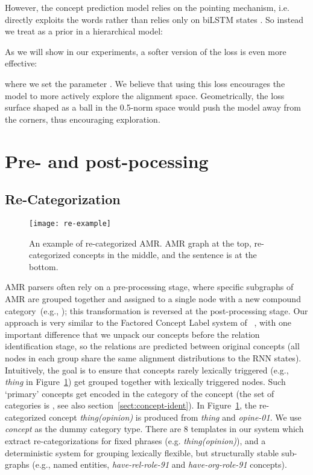 \documentclass[11pt,a4paper]{article}
\begin{document}
However, the concept prediction model  relies on the pointing mechanism, i.e. directly exploits the words  rather than relies only on biLSTM states . So instead we treat  as a prior in a hierarchical model:

As we will show in our experiments, a softer version of the loss 
is even more effective:

where we set the parameter . We believe that using this loss encourages the model to more actively explore the alignment space. Geometrically, the loss surface shaped as a ball in the 0.5-norm space would push the model away from the corners, thus encouraging exploration.

\section{Pre- and post-pocessing}
\label{sect:prepost}

\subsection{Re-Categorization}\label{sec:re-cat}

\begin{figure}[t!]
\centering
\texttt{[image: re-example]}
\vspace{-2ex}
\caption{An example of re-categorized AMR. AMR graph at the top, re-categorized concepts in the middle, and the sentence is at the bottom.}
\label{fig:re-example}
\end{figure}

AMR parsers often rely on a pre-processing stage, where specific subgraphs of AMR are grouped together and assigned to a single node with a new compound category~(e.g., ); this transformation is reversed at the post-processing stage. Our approach is very similar to the Factored Concept Label system of ~, with one important difference that we unpack our concepts before the relation identification stage, so the relations are predicted between original concepts (all nodes in each group share the same alignment distributions to the RNN states). Intuitively, the goal is to ensure that concepts rarely lexically triggered (e.g., \textit{thing} in Figure~\ref{fig:re-example}) get grouped together with lexically triggered nodes. Such `primary' concepts get encoded in the category of the concept (the set of categories is , see also section~\ref{sect:concept-ident}). In Figure~\ref{fig:re-example}, the re-categorized concept {\it thing(opinion)} is produced from {\it thing} and {\it opine-01}. We use \textit{concept} as the dummy category type.
There are 8 templates in our system which extract re-categorizations for fixed phrases (e.g. {\it thing(opinion)}), and a deterministic system for grouping lexically flexible, but structurally stable sub-graphs (e.g., named entities, {\it have-rel-role-91} and {\it have-org-role-91} concepts).
\end{document}

